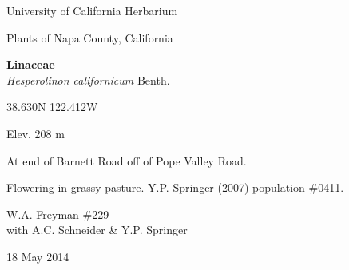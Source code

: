 \documentclass[letterpaper,10pt]{article}
\begin{document}
\begin{minipage}[t]{0.40\textwidth}

\begin{center}
University of California Herbarium \\
\begin{large}
Plants of Napa County, California \\
\end{large}
\vspace{\baselineskip}
\textbf{Linaceae} \\
\textit{Hesperolinon californicum} Benth.\\
\end{center}

\begin{footnotesize}

\begin{multicols}{2}
38.630\textdegree N 122.412\textdegree W
\columnbreak
\begin{flushright}
Elev. 208 m
\end{flushright}
\end{multicols}

At end of Barnett Road off of Pope Valley Road.
\vspace{\baselineskip}

Flowering in grassy pasture. Y.P. Springer (2007) population \#0411.

\begin{multicols}{2}
W.A. Freyman \#229 \\
with A.C. Schneider \& Y.P. Springer
\columnbreak
\begin{flushright}
18 May 2014
\end{flushright}
\end{multicols}

\end{footnotesize}

\end{minipage}

\vspace{2cm}
%
%

%
%
\end{document}
